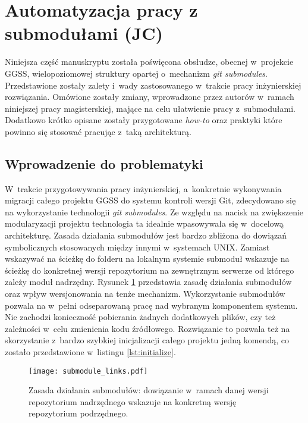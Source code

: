 \clearpage
\section{Automatyzacja pracy z submodułami (JC)}
\label{sec:gitio}

Niniejsza część manuskryptu została poświęcona obsłudze, obecnej w~projekcie GGSS, wielopoziomowej struktury  opartej o~mechanizm \emph{git submodules}. Przedstawione zostały zalety i~wady zastosowanego w~trakcie pracy inżynierskiej rozwiązania. Omówione zostały zmiany, wprowadzone przez autorów w~ramach niniejszej pracy magisterskiej, mające na celu ułatwienie pracy z~submodułami. Dodatkowo krótko opisane zostały przygotowane \emph{how-to} oraz praktyki które powinno się stosować pracując z~taką architekturą.

\subsection{Wprowadzenie do problematyki}
W~trakcie przygotowywania pracy inżynierskiej, a~konkretnie wykonywania migracji całego projektu GGSS do systemu kontroli wersji Git, zdecydowano się na wykorzystanie technologii \emph{git submodules}. Ze względu na nacisk na zwiększenie modularyzacji projektu technologia ta idealnie wpasowywała się w~docelową architekturę. Zasada działania submodułów jest bardzo zbliżona do dowiązań symbolicznych stosowanych między innymi w~systemach UNIX. Zamiast wskazywać na ścieżkę do folderu na lokalnym systemie submoduł wskazuje na ścieżkę do konkretnej wersji repozytorium na zewnętrznym serwerze od którego zależy moduł nadrzędny. Rysunek \ref{fig:submodules_links} przedstawia zasadę działania submodułów oraz wpływ wersjonowania na tenże mechanizm. Wykorzystanie submodułów pozwala na w~pełni odseparowaną pracę nad wybranym komponentem systemu. Nie zachodzi konieczność pobierania żadnych dodatkowych plików, czy też zależności w~celu zmienienia kodu źródłowego. Rozwiązanie to pozwala też na skorzystanie z~bardzo szybkiej inicjalizacji całego projektu jedną komendą, co zostało przedstawione w~listingu \ref{lst:initialize}.

\begin{figure}[H]
    \centering
    \texttt{[image: submodule\_links.pdf]}
    \caption{Zasada działania submodułów: dowiązanie w~ramach danej wersji repozytorium nadrzędnego wskazuje na konkretną wersję repozytorium podrzędnego.}
    \label{fig:submodules_links}
\end{figure}

